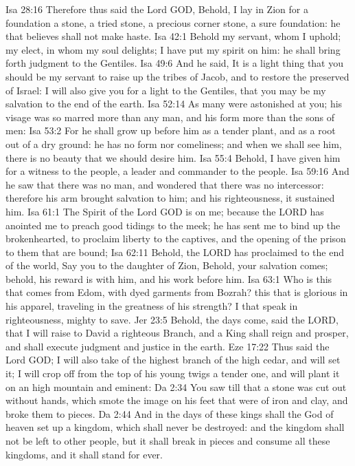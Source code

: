 Isa 28:16  Therefore thus said the Lord GOD, Behold, I lay in Zion for a foundation a stone, a tried stone, a precious corner stone, a sure foundation: he that believes shall not make haste.
Isa 42:1  Behold my servant, whom I uphold; my elect, in whom my soul delights; I have put my spirit on him: he shall bring forth judgment to the Gentiles.
Isa 49:6  And he said, It is a light thing that you should be my servant to raise up the tribes of Jacob, and to restore the preserved of Israel: I will also give you for a light to the Gentiles, that you may be my salvation to the end of the earth.
Isa 52:14  As many were astonished at you; his visage was so marred more than any man, and his form more than the sons of men:
Isa 53:2  For he shall grow up before him as a tender plant, and as a root out of a dry ground: he has no form nor comeliness; and when we shall see him, there is no beauty that we should desire him.
Isa 55:4  Behold, I have given him for a witness to the people, a leader and commander to the people.
Isa 59:16  And he saw that there was no man, and wondered that there was no intercessor: therefore his arm brought salvation to him; and his righteousness, it sustained him.
Isa 61:1  The Spirit of the Lord GOD is on me; because the LORD has anointed me to preach good tidings to the meek; he has sent me to bind up the brokenhearted, to proclaim liberty to the captives, and the opening of the prison to them that are bound;
Isa 62:11  Behold, the LORD has proclaimed to the end of the world, Say you to the daughter of Zion, Behold, your salvation comes; behold, his reward is with him, and his work before him.
Isa 63:1  Who is this that comes from Edom, with dyed garments from Bozrah?  this that is glorious in his apparel, traveling in the greatness of his strength? I that speak in righteousness, mighty to save.
Jer 23:5  Behold, the days come, said the LORD, that I will raise to David a righteous Branch, and a King shall reign and prosper, and shall execute judgment and justice in the earth.
Eze 17:22  Thus said the Lord GOD; I will also take of the highest branch of the high cedar, and will set it; I will crop off from the top of his young twigs a tender one, and will plant it on an high mountain and eminent:
Da 2:34  You saw till that a stone was cut out without hands, which smote the image on his feet that were of iron and clay, and broke them to pieces.
Da 2:44  And in the days of these kings shall the God of heaven set up a kingdom, which shall never be destroyed: and the kingdom shall not be left to other people, but it shall break in pieces and consume all these kingdoms, and it shall stand for ever.
